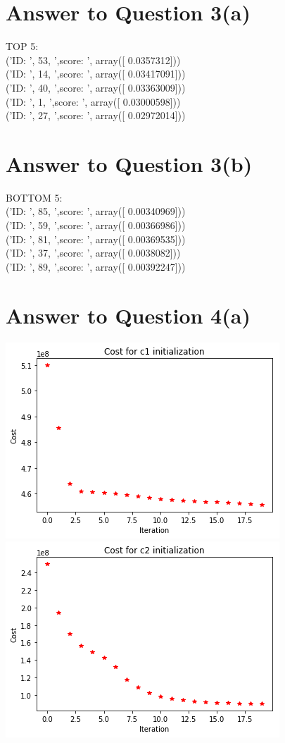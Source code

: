 \documentclass[11pt]{article}
\begin{document}
\section*{Answer to Question 3(a)}
TOP 5:\\
('ID: ', 53, ',score: ', array([ 0.0357312]))\\
('ID: ', 14, ',score: ', array([ 0.03417091]))\\
('ID: ', 40, ',score: ', array([ 0.03363009]))\\
('ID: ', 1, ',score: ', array([ 0.03000598]))\\
('ID: ', 27, ',score: ', array([ 0.02972014]))\\
\section*{Answer to Question 3(b)}

BOTTOM 5:\\
('ID: ', 85, ',score: ', array([ 0.00340969]))\\
('ID: ', 59, ',score: ', array([ 0.00366986]))\\
('ID: ', 81, ',score: ', array([ 0.00369535]))\\
('ID: ', 37, ',score: ', array([ 0.0038082]))\\
('ID: ', 89, ',score: ', array([ 0.00392247]))\\

\section*{Answer to Question 4(a)}
\includegraphics{c1_cost} \\
\includegraphics{c2_cost} 
\end{document}
